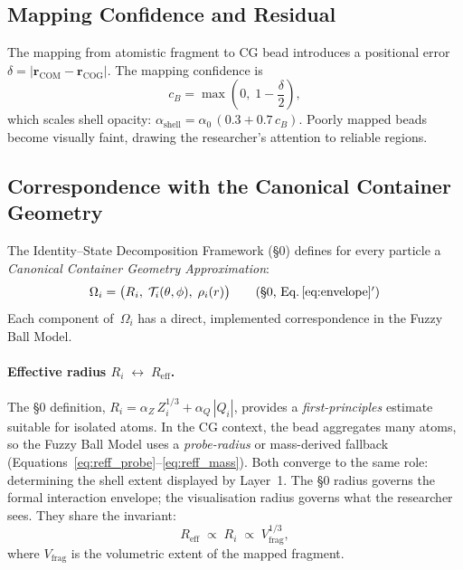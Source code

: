 \documentclass[12pt, a4paper, oneside]{article}
\newcommand{\Rvec}{\bm{r}}
\begin{document}
\subsection{Mapping Confidence and Residual}

The mapping from atomistic fragment to CG bead introduces a
positional error $\delta = |\Rvec_{\text{COM}} - \Rvec_{\text{COG}}|$.
The mapping confidence is
\begin{equation}
  c_B = \max\!\left(0, \; 1 - \frac{\delta}{2}\right),
  \label{eq:mapping_confidence}
\end{equation}
which scales shell opacity: $\alpha_{\text{shell}} =
\alpha_0 \, (0.3 + 0.7 \, c_B)$.  Poorly mapped beads become
visually faint, drawing the researcher's attention to reliable regions.

\subsection{Correspondence with the Canonical Container Geometry}
\label{sec:container-correspondence}

The Identity--State Decomposition Framework (§0) defines for every
particle a \emph{Canonical Container Geometry Approximation}:
%
\begin{equation}
  \Omega_i =
  \bigl(
    R_i,\;
    \mathcal{T}_i(\theta,\phi),\;
    \rho_i(r)
  \bigr)
  \tag{§0, Eq.\,\ref*{eq:envelope}$'$}
  \label{eq:container-omega}
\end{equation}
%
Each component of~$\Omega_i$ has a direct, implemented correspondence
in the Fuzzy Ball Model.

\paragraph{Effective radius $R_i \;\longleftrightarrow\;
            R_{\mathrm{eff}}$.}
The §0 definition,
\(R_i = \alpha_Z\,Z_i^{1/3} + \alpha_Q\,|Q_i|\),
provides a \emph{first-principles} estimate suitable for isolated
atoms.  In the CG context, the bead aggregates many atoms, so the
Fuzzy Ball Model uses a \emph{probe-radius} or mass-derived fallback
(Equations~\ref{eq:reff_probe}--\ref{eq:reff_mass}).  Both converge
to the same role: determining the shell extent displayed by Layer~1.
The §0 radius governs the formal interaction envelope; the
visualisation radius governs what the researcher sees.  They share
the invariant:
\begin{equation}
  R_{\text{eff}} \;\propto\; R_i \;\propto\; V_{\text{frag}}^{1/3},
  \label{eq:radius-link}
\end{equation}
where $V_{\text{frag}}$ is the volumetric extent of the mapped
fragment.
\end{document}
